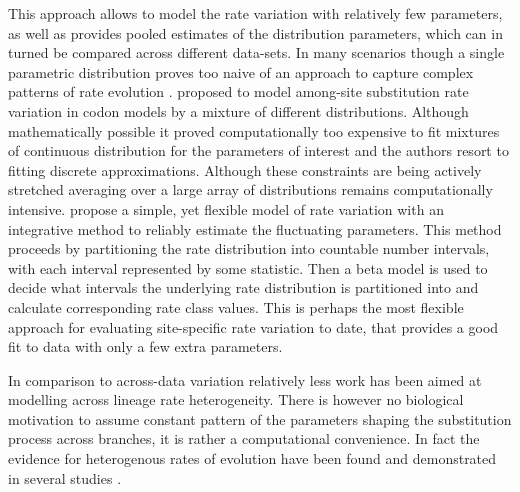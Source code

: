 This approach allows to model the rate variation with relatively few parameters, as well as provides pooled estimates of the distribution parameters, which can in turned be compared across different data-sets.  
In many scenarios though a single parametric distribution proves too naive of an approach to capture complex patterns of rate evolution \citep{Pond2005a}.
\cite{Yang2000} proposed to model among-site substitution rate variation in codon models by a mixture of different distributions.
Although mathematically possible it proved computationally too expensive to fit mixtures of continuous distribution for the parameters of interest and the authors resort to fitting discrete approximations.
Although these constraints are being actively stretched \citep{Suchard2009,Ayres2012} averaging over a large array of distributions remains computationally intensive. 
\citet{Pond2005a} propose a simple, yet flexible model of rate variation with an integrative method to reliably estimate the fluctuating parameters.
This method proceeds by partitioning the rate distribution into countable number intervals, with each interval represented by some statistic.
Then a beta model is used to decide what intervals the underlying rate distribution is partitioned into and calculate corresponding rate class values.
This is perhaps the most flexible approach for evaluating site-specific rate variation to date, that provides a good fit to data with only a few extra parameters.

In comparison to across-data variation relatively less work has been aimed at modelling across lineage rate heterogeneity.
There is however no biological motivation to assume constant pattern of the parameters shaping the substitution process across branches, it is rather a computational convenience.
In fact the evidence for heterogenous rates of evolution have been found and demonstrated in several studies \citep{EyreWalker1997,Andreasen2001}.
























